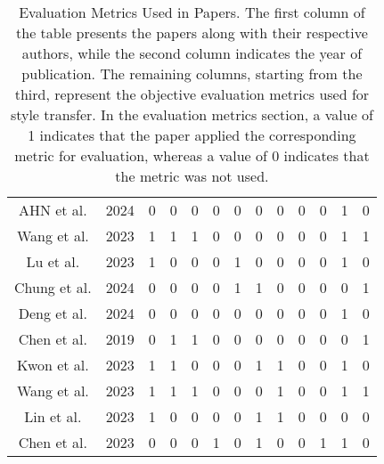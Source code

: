 \begin{table}[t]
{\begin{tabular}{ccccccccccccc}
                AHN et al.\citep{63ahn2024dreamstyler} & 2024 & 0 & 0 & 0 & 0 & 0 & 0 & 0 & 0 & 0 & 1 & 0 \\
                Wang et al.\citep{64wang2023stylediffusion} & 2023 & 1 & 1 & 1 & 0 & 0 & 0 & 0 & 0 & 0 & 1 & 1 \\
                Lu et al.\citep{65lu2023specialist} & 2023 & 1 & 0 & 0 & 0 & 1 & 0 & 0 & 0 & 0 & 1 & 0 \\
                Chung et al.\citep{66chung2024style} & 2024 & 0 & 0 & 0 & 0 & 1 & 1 & 0 & 0 & 0 & 0 & 1 \\
                Deng et al.\citep{67deng2024z} & 2024 & 0 & 0 & 0 & 0 & 0 & 0 & 0 & 0 & 0 & 1 & 0 \\
                Chen et al.\citep{70chen2019drop} & 2019 & 0 & 1 & 1 & 0 & 0 & 0 & 0 & 0 & 0 & 0 & 1 \\
                Kwon et al.\citep{71kwon2024aesfa} & 2023 & 1 & 1 & 0 & 0 & 0 & 1 & 1 & 0 & 0 & 1 & 0 \\
                Wang et al.\citep{72wang2023microast} & 2023 & 1 & 1 & 1 & 0 & 0 & 0 & 1 & 0 & 0 & 1 & 1 \\
                Lin et al.\citep{78lin2023adacm} & 2023 & 1 & 0 & 0 & 0 & 0 & 1 & 1 & 0 & 0 & 0 & 0 \\
                Chen et al.\citep{80cheng2023user} & 2023 & 0 & 0 & 0 & 1 & 0 & 1 & 0 & 0 & 1 & 1 & 0 \\
                \bottomrule
            \end{tabular}
    }
    \caption{Evaluation Metrics Used in Papers. The first column of the table presents the papers along with their respective authors, while the second column indicates the year of publication. The remaining columns, starting from the third, represent the objective evaluation metrics used for style transfer. In the evaluation metrics section, a value of 1 indicates that the paper applied the corresponding metric for evaluation, whereas a value of 0 indicates that the metric was not used.}\label{table1_Evaluation}
\end{table}

